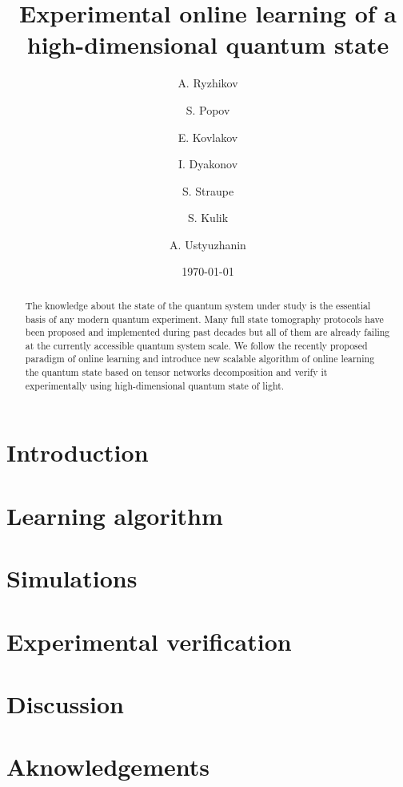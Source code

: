 \documentclass[%
 reprint,
 amsmath,amssymb,
 aps,
]{revtex4-2}
\begin{document}

\title{Experimental online learning of a high-dimensional quantum state}%

\author{A. Ryzhikov}
\author{S. Popov}%
%

\author{E. Kovlakov}
\author{I. Dyakonov}
\author{S. Straupe}
\author{S. Kulik}
%

\author{A. Ustyuzhanin}
%

\date{\today}%

\begin{abstract}
The knowledge about the state of the quantum system under study is the essential basis of any modern quantum experiment. Many full state tomography protocols have been proposed and implemented during past decades but all of them are already failing at the currently accessible quantum system scale. We follow the recently proposed paradigm of online learning and introduce new scalable algorithm of online learning the quantum state based on tensor networks decomposition and verify it experimentally using high-dimensional quantum state of light.
\end{abstract}

\maketitle


\section{\label{sec:intro}Introduction}

\section{\label{sec:algo}Learning algorithm}

\section{\label{sec:sim}Simulations}

\section{\label{sec:exp}Experimental verification}

\section{\label{sec:discuss}Discussion}

\section{\label{sec:acknowledge}Aknowledgements}

\end{document}
